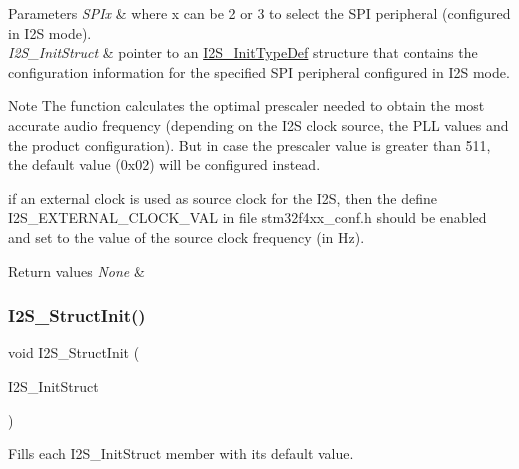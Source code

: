 \begin{DoxyParams}{Parameters}
{\em S\+P\+Ix} & where x can be 2 or 3 to select the S\+PI peripheral (configured in I2S mode). \\
\hline
{\em I2\+S\+\_\+\+Init\+Struct} & pointer to an \mbox{\hyperlink{struct_i2_s___init_type_def}{I2\+S\+\_\+\+Init\+Type\+Def}} structure that contains the configuration information for the specified S\+PI peripheral configured in I2S mode.\\
\hline
\end{DoxyParams}
\begin{DoxyNote}{Note}
The function calculates the optimal prescaler needed to obtain the most accurate audio frequency (depending on the I2S clock source, the P\+LL values and the product configuration). But in case the prescaler value is greater than 511, the default value (0x02) will be configured instead. ~\newline
 

if an external clock is used as source clock for the I2S, then the define I2\+S\+\_\+\+E\+X\+T\+E\+R\+N\+A\+L\+\_\+\+C\+L\+O\+C\+K\+\_\+\+V\+AL in file stm32f4xx\+\_\+conf.\+h should be enabled and set to the value of the source clock frequency (in Hz).
\end{DoxyNote}

\begin{DoxyRetVals}{Return values}
{\em None} & \\
\hline
\end{DoxyRetVals}
\mbox{\label{group___s_p_i_ga7470ec1d0759fdeeb42c7fe71a3b41b7}} 
\subsubsection{\texorpdfstring{I2\+S\+\_\+\+Struct\+Init()}{I2S\_StructInit()}}
{\footnotesize\ttfamily void I2\+S\+\_\+\+Struct\+Init (\begin{DoxyParamCaption}\item[{\mbox{\hyperlink{struct_i2_s___init_type_def}{I2\+S\+\_\+\+Init\+Type\+Def}} $\ast$}]{I2\+S\+\_\+\+Init\+Struct }\end{DoxyParamCaption})}



Fills each I2\+S\+\_\+\+Init\+Struct member with its default value. 


